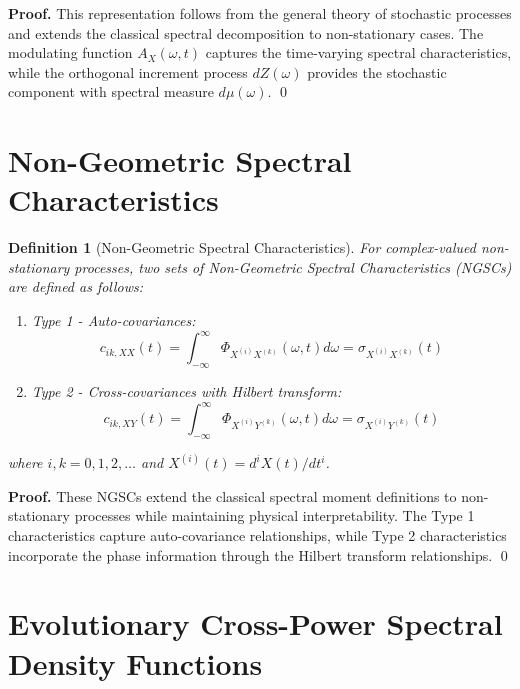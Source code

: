 \documentclass[12pt,a4paper]{article}
\newtheorem{definition}[theorem]{Definition}
\renewenvironment{proof}{\noindent\textbf{Proof.}}{\qed}
\begin{document}
\begin{proof}
This representation follows from the general theory of stochastic processes and extends the classical spectral decomposition to non-stationary cases. The modulating function $A_X(\omega, t)$ captures the time-varying spectral characteristics, while the orthogonal increment process $dZ(\omega)$ provides the stochastic component with spectral measure $d\mu(\omega)$.
\end{proof}

\section{Non-Geometric Spectral Characteristics}

\begin{definition}[Non-Geometric Spectral Characteristics]\label{def:ngsc}
For complex-valued non-stationary processes, two sets of Non-Geometric Spectral Characteristics (NGSCs) are defined as follows:

\begin{enumerate}[label=(\roman*)]
\item Type 1 - Auto-covariances:
\begin{equation}\label{eq:ngsc_type1}
c_{ik,XX}(t) = \int_{-\infty}^{\infty} \Phi_{X^{(i)}X^{(k)}}(\omega, t) d\omega = \sigma_{X^{(i)}X^{(k)}}(t)
\end{equation}

\item Type 2 - Cross-covariances with Hilbert transform:
\begin{equation}\label{eq:ngsc_type2}
c_{ik,XY}(t) = \int_{-\infty}^{\infty} \Phi_{X^{(i)}Y^{(k)}}(\omega, t) d\omega = \sigma_{X^{(i)}Y^{(k)}}(t)
\end{equation}
\end{enumerate}

where $i, k = 0, 1, 2, \ldots$ and $X^{(i)}(t) = d^i X(t)/dt^i$.
\end{definition}

\begin{proof}
These NGSCs extend the classical spectral moment definitions to non-stationary processes while maintaining physical interpretability. The Type 1 characteristics capture auto-covariance relationships, while Type 2 characteristics incorporate the phase information through the Hilbert transform relationships.
\end{proof}

\section{Evolutionary Cross-Power Spectral Density Functions}
\end{document}
